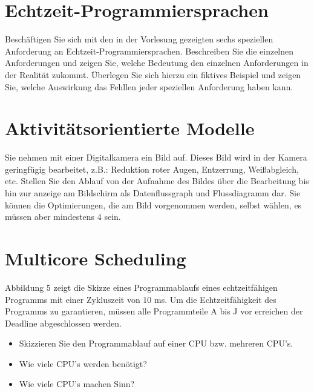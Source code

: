 \documentclass[12pt,a4paper,ngerman]{article}
\begin{document}
\pagebreak
{}
\pagebreak

\section*{Echtzeit-Programmiersprachen}


\begin{framed}
Beschäftigen Sie sich mit den in der Vorlesung gezeigten sechs speziellen Anforderung an Echtzeit-Programmiersprachen. Beschreiben Sie die einzelnen Anforderungen und zeigen Sie, welche Bedeutung den einzelnen Anforderungen in der Realität zukommt. Überlegen Sie sich hierzu ein fiktives Beispiel und zeigen Sie, welche Auswirkung das Fehllen jeder speziellen Anforderung haben kann. 
\end{framed}
\pagebreak

\section*{Aktivitätsorientierte Modelle}


\begin{framed}
Sie nehmen mit einer Digitalkamera ein Bild auf. Dieses Bild wird in der Kamera geringfügig bearbeitet, z.B.: Reduktion roter Augen, Entzerrung, Weißabgleich, etc. Stellen Sie den Ablauf von der Aufnahme des Bildes über die Bearbeitung bis hin zur anzeige am Bildschirm als Datenflussgraph und Flussdiagramm dar. Sie können die Optimierungen, die am Bild vorgenommen werden, selbst wählen, es müssen aber mindestens 4 sein.
\end{framed}

\pagebreak

\section*{Multicore Scheduling}


\begin{framed}
Abbildung 5 zeigt die Skizze eines Programmablaufs eines echtzeitfähigen Programms mit einer Zykluszeit von $10$ ms. Um die Echtzeitfähigkeit des Programms zu garantieren, müssen alle Programmteile A bis J vor erreichen der Deadline abgeschlossen werden. \\
\begin{itemize}
\item Skizzieren Sie den Programmablauf auf einer CPU bzw. mehreren CPU's.
\item Wie viele CPU's werden benötigt?
\item Wie viele CPU's machen Sinn?
\end{itemize}
\end{framed}



   
   
\end{document}
